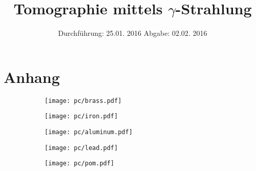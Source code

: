 

\subject{Fortgeschrittenen Praktikum V14}
\title{Tomographie mittels \texorpdfstring{$\gamma$}{Gamma}-Strahlung}
\date{
  Durchführung: 25.01. 2016
  \hspace{3em}
  Abgabe: 02.02. 2016
}



\maketitle
\thispagestyle{empty}
\tableofcontents
\newpage






\printbibliography

\section{Anhang}
\begin{figure}[p]
  \centering
\begin{subfigure}{0.7\textwidth}
  \centering
  \texttt{[image: pc/brass.pdf]}
\end{subfigure}
\begin{subfigure}{0.7\textwidth}
  \centering
  \texttt{[image: pc/iron.pdf]}
\end{subfigure}
\begin{subfigure}{0.7\textwidth}
  \centering
  \texttt{[image: pc/aluminum.pdf]}
\end{subfigure}
\end{figure}
\begin{figure}[p]
  \centering
\begin{subfigure}{0.7\textwidth}
  \centering
  \texttt{[image: pc/lead.pdf]}
\end{subfigure}
\centering
\begin{subfigure}{0.7\textwidth}
  \centering
  \texttt{[image: pc/pom.pdf]}
\end{subfigure}
\end{figure}


